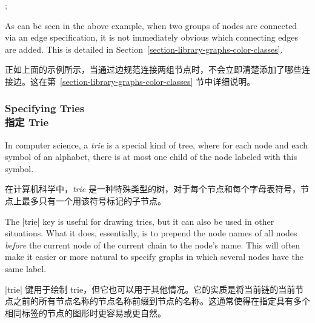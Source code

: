 \begin{codeexample}[preamble={\usetikzlibrary{graphs}}]
\tikz {};
\end{codeexample}

As can be seen in the above example, when two groups of nodes are connected via
an edge specification, it is not immediately obvious which connecting edges are
added. This is detailed in Section~\ref{section-library-graphs-color-classes}.

正如上面的示例所示，当通过边规范连接两组节点时，不会立即清楚添加了哪些连接边。这在第~\ref{section-library-graphs-color-classes} 节中详细说明。


\subsubsection{Specifying Tries\\指定 Trie}

In computer science, a \emph{trie} is a special kind of tree, where for each
node and each symbol of an alphabet, there is at most one child of the node
labeled with this symbol.

在计算机科学中，\emph{trie} 是一种特殊类型的树，对于每个节点和每个字母表符号，节点上最多只有一个用该符号标记的子节点。

The |trie| key is useful for drawing tries, but it can also be used in other
situations. What it does, essentially, is to prepend the node names of all
nodes \emph{before} the current node of the current chain to the node's name.
This will often make it easier or more natural to specify graphs in which
several nodes have the same label.

|trie| 键用于绘制 trie，但它也可以用于其他情况。它的实质是将当前链的当前节点之前的所有节点名称的节点名称前缀到节点的名称。这通常使得在指定具有多个相同标签的节点的图形时更容易或更自然。


